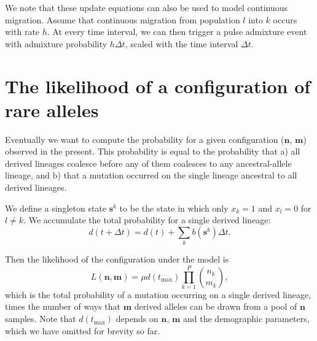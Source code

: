 \documentclass[a4paper]{article}
\begin{document}
We note that these update equations can also be used to model continuous migration. Assume that continuous migration from population $l$ into $k$ occurs with rate $h$. At every time interval, we can then trigger a pulse admixture event with admixture probability $h\Delta t$, scaled with the time interval $\Delta t$.
 
\section{The likelihood of a configuration of rare alleles}
    
Eventually we want to compute the probability for a given configuration ($\mathbf{n}$, $\mathbf{m}$) observed in the present. This probability is equal to the probability that a) all derived lineages coalesce before any of them coalesces to any ancestral-allele lineage, and b) that a mutation occurred on the single lineage ancestral to all derived lineages.

We define a singleton state $\mathbf{s}^k$ to be the state in which only $x_k=1$ and $x_l=0$ for $l\neq k$. We accumulate the total probability for a single derived lineage:
\begin{equation}
    d(t+\Delta t) = d(t) + \sum_k b(\mathbf{s}^k)\Delta t.
\end{equation}

Then the likelihood of the configuration under the model is
\begin{equation}
    \label{eq_Lnm}
    L(\mathbf{n}, \mathbf{m})=\mu d(t_\mathrm{max}) \prod_{k=1}^P \binom{n_k}{m_k},
\end{equation}
which is the total probability of a mutation occurring on a single derived lineage, times the number of ways that $\mathbf{m}$ derived alleles can be drawn from a pool of $\mathbf{n}$ samples. Note that $d(t_\mathrm{max})$ depends on $\mathbf{n}$, $\mathbf{m}$ and the demographic parameters, which we have omitted for brevity so far. 
\end{document}
